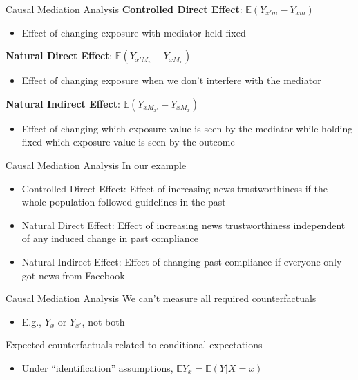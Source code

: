 \documentclass[14pt]{beamer}
\newcommand{\CMA}{Causal Mediation Analysis}
\newcommand{\bE}{\mathbb{E}}
\begin{document}
\begin{frame}{Causal Mediation Analysis}
    \textbf{Controlled Direct Effect}: $\mathbb{E}(Y_{x'm} - Y_{xm})$
    \begin{itemize}
        \item Effect of changing exposure with mediator held fixed \newline
    \end{itemize}

    \textbf{Natural Direct Effect}: $\mathbb{E}(Y_{x'M_{x}} - Y_{xM_{x}})$
    \begin{itemize}
        \item Effect of changing exposure when we don't interfere with the mediator  \newline
    \end{itemize}

    \textbf{Natural Indirect Effect}: $\mathbb{E}(Y_{xM_{x'}} - Y_{xM_{x}})$
    \begin{itemize}
        \item Effect of changing which exposure value is seen by the mediator while holding fixed which exposure value is seen by the outcome
    \end{itemize}
\end{frame}

\begin{frame}{\CMA}
    In our example
    \begin{itemize}
        \item Controlled Direct Effect: Effect of increasing news trustworthiness if the whole population followed guidelines in the past
        \item Natural Direct Effect: Effect of increasing news trustworthiness independent of any induced change in past compliance
        \item Natural Indirect Effect: Effect of changing past compliance if everyone only got news from Facebook
    \end{itemize}
\end{frame}

\begin{frame}{\CMA}
    We can't measure all required counterfactuals
    \begin{itemize}
        \item E.g., $Y_x$ or $Y_{x'}$, not both \newline
    \end{itemize}

    Expected counterfactuals related to conditional expectations

    \begin{itemize}
        \item     Under  ``identification'' assumptions, $\bE Y_x = \bE(Y | X=x)$ \newline
    \end{itemize}
\end{frame}
\end{document}
